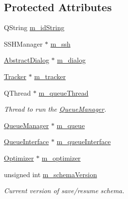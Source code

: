 \subsection*{Protected Attributes}
\begin{DoxyCompactItemize}
\item 
Q\+String \hyperlink{classGlobalSearch_1_1OptBase_af9223062bbb616246d5bf60ad29e1c7d}{m\+\_\+id\+String}
\item 
S\+S\+H\+Manager $\ast$ \hyperlink{classGlobalSearch_1_1OptBase_a723a6dd0bb93aff451007ccb079e2f65}{m\+\_\+ssh}
\item 
\hyperlink{classGlobalSearch_1_1AbstractDialog}{Abstract\+Dialog} $\ast$ \hyperlink{classGlobalSearch_1_1OptBase_a4673e81b57e648320474bf3024906161}{m\+\_\+dialog}
\item 
\hyperlink{classGlobalSearch_1_1Tracker}{Tracker} $\ast$ \hyperlink{classGlobalSearch_1_1OptBase_a60a2c6053a8ae3716854c68d0837b921}{m\+\_\+tracker}
\item 
\hypertarget{classGlobalSearch_1_1OptBase_a80b28eb1b9d8d7a055ddabb55c753f20}{}Q\+Thread $\ast$ \hyperlink{classGlobalSearch_1_1OptBase_a80b28eb1b9d8d7a055ddabb55c753f20}{m\+\_\+queue\+Thread}\label{classGlobalSearch_1_1OptBase_a80b28eb1b9d8d7a055ddabb55c753f20}

\begin{DoxyCompactList}\small\item\em Thread to run the \hyperlink{classGlobalSearch_1_1QueueManager}{Queue\+Manager}. \end{DoxyCompactList}\item 
\hyperlink{classGlobalSearch_1_1QueueManager}{Queue\+Manager} $\ast$ \hyperlink{classGlobalSearch_1_1OptBase_a187a29ceafe0c4a45ecb7a925267f93a}{m\+\_\+queue}
\item 
\hyperlink{classGlobalSearch_1_1QueueInterface}{Queue\+Interface} $\ast$ \hyperlink{classGlobalSearch_1_1OptBase_a8f5f83dae1456bbff32ea9b3b6731ba0}{m\+\_\+queue\+Interface}
\item 
\hyperlink{classGlobalSearch_1_1Optimizer}{Optimizer} $\ast$ \hyperlink{classGlobalSearch_1_1OptBase_a9bc76450b0d52ab9fc9a4caaf97143b7}{m\+\_\+optimizer}
\item 
\hypertarget{classGlobalSearch_1_1OptBase_a7e2fe2db52705fd57edf9178e03345bd}{}unsigned int \hyperlink{classGlobalSearch_1_1OptBase_a7e2fe2db52705fd57edf9178e03345bd}{m\+\_\+schema\+Version}\label{classGlobalSearch_1_1OptBase_a7e2fe2db52705fd57edf9178e03345bd}

\begin{DoxyCompactList}\small\item\em Current version of save/resume schema. \end{DoxyCompactList}\end{DoxyCompactItemize}


